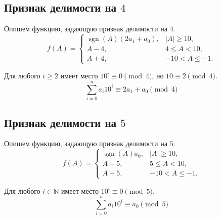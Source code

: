 \documentclass[14pt, a4paper]{extarticle}
\theoremstyle{definition}
\DeclareMathOperator{\sgn}{sgn}
\begin{document}
\subsection{Признак делимости на $4$}

	Опишем функцию, задающую признак делимости на $4$.
	$$f(A)=\begin{cases}
		\sgn(A)(2a_1+a_0),&|A|\geqslant10,\\
		A-4,&4\leqslant A<10,\\
		A+4,&-10<A\leqslant-1.
	\end{cases}$$

	Для любого $i\geqslant2$ имеет место $10^i\equiv0\pmod4$, но $10\equiv2\pmod4$.
	$$\sum_{i=0}^na_i10^i\equiv2a_1+a_0\pmod4$$

\subsection{Признак делимости на $5$}

	Опишем функцию, задающую признак делимости на $5$.
	$$f(A)=\begin{cases}
		\sgn(A)a_0,&|A|\geqslant10,\\
		A-5,&5\leqslant A<10,\\
		A+5,&-10<A\leqslant-1.
	\end{cases}$$

	Для любого $i\in\mathbb{N}$ имеет место $10^i\equiv0\pmod5$.
	$$\sum_{i=0}^na_i10^i\equiv a_0\pmod5$$
\end{document}
